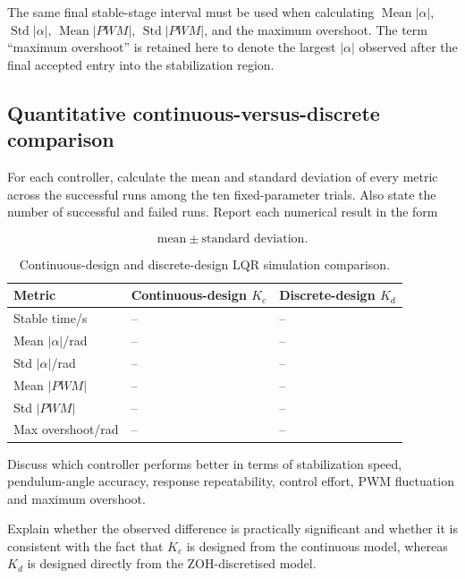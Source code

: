 \documentclass[11pt,a4paper]{article}
\begin{document}
The same final stable-stage interval must be used when calculating
$\operatorname{Mean}|\alpha|$, $\operatorname{Std}|\alpha|$,
$\operatorname{Mean}|PWM|$, $\operatorname{Std}|PWM|$, and the maximum
overshoot. The term ``maximum overshoot'' is retained here to denote the
largest $|\alpha|$ observed after the final accepted entry into the
stabilization region.


\subsection{Quantitative continuous-versus-discrete comparison}

For each controller, calculate the mean and standard deviation of every metric
across the successful runs among the ten fixed-parameter trials. Also state the
number of successful and failed runs. Report each numerical result in the form

\[
\text{mean}\pm\text{standard deviation}.
\]

\begin{table}[H]
\centering
\caption{Continuous-design and discrete-design LQR simulation comparison.}
\label{tab:simcompare}
\small
\begin{tabularx}{\linewidth}
{>{\raggedright\arraybackslash}X
 >{\centering\arraybackslash}X
 >{\centering\arraybackslash}X}
\toprule
Metric &
Continuous-design $K_c$ &
Discrete-design $K_d$\\
\midrule
Stable time/s & -- & --\\
Mean $|\alpha|$/rad & -- & --\\
Std $|\alpha|$/rad & -- & --\\
Mean $|PWM|$ & -- & --\\
Std $|PWM|$ & -- & --\\
Max overshoot/rad & -- & --\\
\bottomrule
\end{tabularx}
\end{table}

Discuss which controller performs better in terms of stabilization speed,
pendulum-angle accuracy, response repeatability, control effort, PWM
fluctuation and maximum overshoot.

Explain whether the observed difference is practically significant and whether
it is consistent with the fact that $K_c$ is designed from the continuous
model, whereas $K_d$ is designed directly from the ZOH-discretised model.
\end{document}
